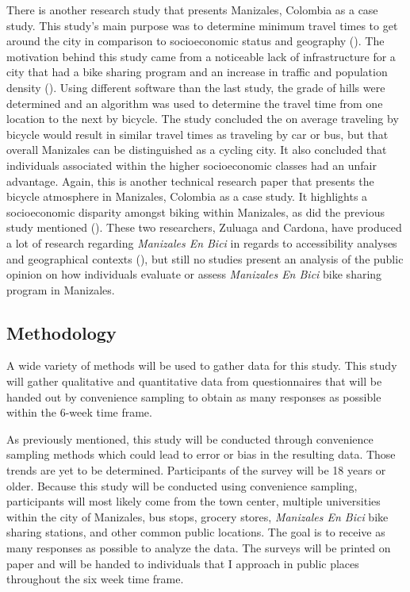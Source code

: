\documentclass[12pt]{article}
\begin{document}
There is another research study that presents Manizales, Colombia as a case study. This study's main purpose was to determine minimum travel times to get around the city in comparison to socioeconomic status and geography (\cite{cardona}). The motivation behind this study came from a noticeable lack of infrastructure for a city that had a bike sharing program and an increase in traffic and population density (\cite{cardona}). Using different software than the last study, the grade of hills were determined and an algorithm was used to determine the travel time from one location to the next by bicycle. The study concluded the on average traveling by bicycle would result in similar travel times as traveling by car or bus, but that overall Manizales can be distinguished as a cycling city. It also concluded that individuals associated within the higher socioeconomic classes had an unfair advantage. Again, this is another technical research paper that presents the bicycle atmosphere in Manizales, Colombia as a case study. It highlights a socioeconomic disparity amongst biking within Manizales, as did the previous study mentioned (\cite{zuluaga_garcía_2017}). These two researchers, Zuluaga and Cardona, have produced a lot of research regarding \textit{Manizales En Bici} in regards to accessibility analyses and geographical contexts (\cite{cardona2017analisis}), but still no studies present an analysis of the public opinion on how individuals evaluate or assess \textit{Manizales En Bici} bike sharing program in Manizales.

\subsection*{Methodology}

A wide variety of methods will be used to gather data for this study. This study will gather qualitative and quantitative data from questionnaires that will be handed out by convenience sampling to obtain as many responses as possible within the 6-week time frame.

As previously mentioned, this study will be conducted through convenience sampling methods which could lead to error or bias in the resulting data. Those trends are yet to be determined. Participants of the survey will be 18 years or older. Because this study will be conducted using convenience sampling, participants will most likely come from the town center, multiple universities within the city of Manizales, bus stops, grocery stores, \textit{Manizales En Bici} bike sharing stations, and other common public locations. The goal is to receive as many responses as possible to analyze the data. The surveys will be printed on paper and will be handed to individuals that I approach in public places throughout the six week time frame.
\end{document}
